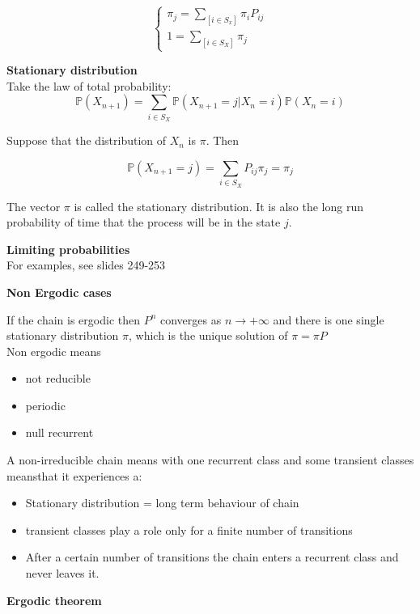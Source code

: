 $$\begin{cases} \pi_j = \sum_{[i\in S_x]} \pi_i P_{ij} \\ 1 = \sum_{[i \in S_X]} \pi_j  \end{cases}$$

\textbf{Stationary distribution}\\

Take the law of total probability:\\

$$\mathbb{P}(X_{n+1}) = \sum_{i \in S_X} \mathbb{P}(X_{n+1} = j|X_n = i) \mathbb{P}(X_n = i)$$

Suppose that the distribution of $X_n$ is $\pi$. Then

$$\mathbb{P}(X_{n+1} = j) = \sum_{i \in S_X} P_{ij} \pi_j = \pi_j $$

The vector $\pi$ is called the stationary distribution. It is also the long run probability of time that the process will be in the state $j$.

\textbf{Limiting probabilities}\\

For examples, see slides 249-253

\textbf{Non Ergodic cases}

If the chain is ergodic then $P^n$ converges as $n \rightarrow +\infty$ and there is one single stationary distribution $\pi$, which is the unique solution of $\pi = \pi P$\\

Non ergodic means
\begin{itemize}
	\item not reducible
	\item periodic
	\item null recurrent
\end{itemize}

A non-irreducible chain means with one recurrent class and some transient classes meansthat it experiences a:

\begin{itemize}
	\item Stationary distribution = long term behaviour of chain
	\item transient classes play a role only for a finite number of transitions
	\item After a certain number of transitions the chain enters a recurrent class and never leaves it.
\end{itemize}

\textbf{Ergodic theorem}\\

